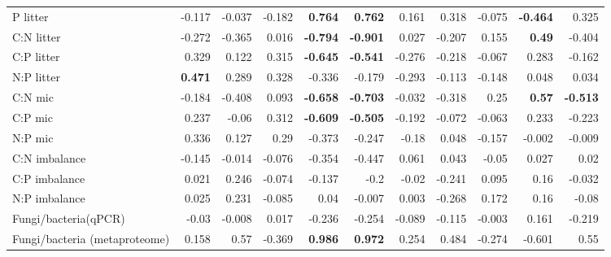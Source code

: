 \documentclass[10pt]{article}
\begin{document}
\begin{flushleft}
\begin{landscape}
\begin{table}[h!]
\begin{center}
{\begin{tabular}{lrrrrrrrrrr}
  P litter & -0.117 & -0.037 & -0.182 & \textbf{0.764} & \textbf{0.762} & 0.161 & 0.318 & -0.075 & \textbf{-0.464} & 0.325 \\ 
  C:N litter & -0.272 & -0.365 & 0.016 & \textbf{-0.794} & \textbf{-0.901} & 0.027 & -0.207 & 0.155 & \textbf{0.49} & -0.404 \\ 
  C:P litter & 0.329 & 0.122 & 0.315 & \textbf{-0.645} & \textbf{-0.541} & -0.276 & -0.218 & -0.067 & 0.283 & -0.162 \\ 
  N:P litter & \textbf{0.471} & 0.289 & 0.328 & -0.336 & -0.179 & -0.293 & -0.113 & -0.148 & 0.048 & 0.034 \\ 
  C:N mic & -0.184 & -0.408 & 0.093 & \textbf{-0.658} & \textbf{-0.703} & -0.032 & -0.318 & 0.25 & \textbf{0.57} & \textbf{-0.513} \\ 
  C:P mic & 0.237 & -0.06 & 0.312 & \textbf{-0.609} & \textbf{-0.505} & -0.192 & -0.072 & -0.063 & 0.233 & -0.223 \\ 
  N:P mic & 0.336 & 0.127 & 0.29 & -0.373 & -0.247 & -0.18 & 0.048 & -0.157 & -0.002 & -0.009 \\ 
  C:N imbalance & -0.145 & -0.014 & -0.076 & -0.354 & -0.447 & 0.061 & 0.043 & -0.05 & 0.027 & 0.02 \\ 
  C:P imbalance & 0.021 & 0.246 & -0.074 & -0.137 & -0.2 & -0.02 & -0.241 & 0.095 & 0.16 & -0.032 \\ 
  N:P imbalance & 0.025 & 0.231 & -0.085 & 0.04 & -0.007 & 0.003 & -0.268 & 0.172 & 0.16 & -0.08 \\ 
  Fungi/bacteria(qPCR) & -0.03 & -0.008 & 0.017 & -0.236 & -0.254 & -0.089 & -0.115 & -0.003 & 0.161 & -0.219 \\ 
  Fungi/bacteria (metaproteome) & 0.158 & 0.57 & -0.369 & \textbf{0.986} & \textbf{0.972} & 0.254 & 0.484 & -0.274 & -0.601 & 0.55 \\ 
   \hline
\end{tabular}
}
\end{center}
\end{table}\end{landscape}


\end{flushleft}
\end{document}
